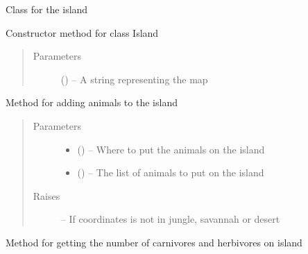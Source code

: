 \documentclass[a4paper,10pt,english]{sphinxmanual}
\begin{document}
\begin{fulllineitems}
\label{\detokenize{island:biosim.island.Island}}
Class for the island

Constructor method for class Island
\begin{quote}\begin{description}
\item[{Parameters}] \leavevmode
{} () -- A string representing the map

\end{description}\end{quote}

\begin{fulllineitems}
\label{\detokenize{island:biosim.island.Island.add_animal_island}}
Method for adding animals to the island
\begin{quote}\begin{description}
\item[{Parameters}] \leavevmode\begin{itemize}
\item {} 
 () -- Where to put the animals on the island

\item {} 
 () -- The list of animals to put on the island

\end{itemize}

\item[{Raises}] \leavevmode
{} -- If coordinates is not in jungle, savannah or desert

\end{description}\end{quote}

\end{fulllineitems}


\begin{fulllineitems}
\label{\detokenize{island:biosim.island.Island.animals_on_island}}
Method for getting the number of carnivores and herbivores on island


\end{fulllineitems}
\end{fulllineitems}
\end{document}
